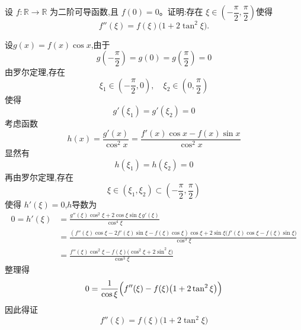 \begin{questions}
    \question 设 $f:\mathbb{R}\to\mathbb{R}$ 为二阶可导函数,且 $f(0)=0$。证明:存在
    $\xi\in\left(-\dfrac{\pi}{2},\dfrac{\pi}{2}\right)$使得
    \[
    f''(\xi)=f(\xi)\bigl(1+2\tan^2\xi\bigr).
    \]
    \begin{solution}
        设$g(x)=f(x)\cos x$,由于
        \[
        g\left(-\frac{\pi}{2}\right)=g(0)=g\left(\frac{\pi}{2}\right)=0
        \]
        由罗尔定理,存在
        \[
        \xi_1\in\left(-\frac{\pi}{2},0\right),\quad
        \xi_2\in\left(0,\frac{\pi}{2}\right)
        \]
        使得
        \[
        g'(\xi_1)=g'(\xi_2)=0
        \]
        考虑函数
        \[
        h(x)=\frac{g'(x)}{\cos^2 x}
        =\frac{f'(x)\cos x-f(x)\sin x}{\cos^2 x}
        \]
        显然有
        \[
        h(\xi_1)=h(\xi_2)=0
        \]
        再由罗尔定理,存在
        \[
        \xi\in(\xi_1,\xi_2)\subset\left(-\frac{\pi}{2},\frac{\pi}{2}\right)
        \]
        使得 $h'(\xi)=0$,$h$导数为
        \begin{align*}
        0=h'(\xi)
        &=\frac{g''(\xi)\cos^2\xi+2\cos\xi\sin\xi\,g'(\xi)}{\cos^4\xi} \\
        &=\frac{(f''(\xi)\cos\xi-2f'(\xi)\sin\xi-f(\xi)\cos\xi)\cos\xi
        +2\sin\xi\bigl(f'(\xi)\cos\xi-f(\xi)\sin\xi\bigr)}{\cos^3\xi} \\
        &=\frac{f''(\xi)\cos^2\xi-f(\xi)\bigl(\cos^2\xi+2\sin^2\xi\bigr)}{\cos^3\xi}
        \end{align*}
        整理得
        \[
        0=\frac{1}{\cos\xi}\Bigl(f''(\xi)-f(\xi)\bigl(1+2\tan^2\xi\bigr)\Bigr)
        \]
        因此得证
        \[
        f''(\xi)=f(\xi)\bigl(1+2\tan^2\xi\bigr)
        \]
    \end{solution}


\end{questions}
